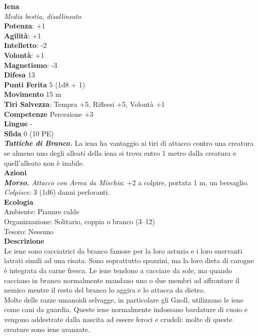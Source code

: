 \begin{multicols}{2}
\medskip\textbf{Iena}\\
\emph{Media bestia, disallineato}\\
\textbf{Potenza}: +1\\
\textbf{Agilità}: +1\\
\textbf{Intelletto}: -2\\
\textbf{Volontà}: +1\\
\textbf{Magnetismo}: -3\\
\textbf{Difesa} 13\\
\textbf{Punti Ferita} 5 (1d8 + 1)\\
\textbf{Movimento} 15 m\\
\textbf{Tiri Salvezza}: Tempra +5, Riflessi +5, Volontà +1 \\
\textbf{Competenze} Percezione +3\\
\textbf{Lingue} -\\
\textbf{Sfida} 0 (10 PE)\smallskip\\
\emph{\textbf{Tattiche di Branco.}} La iena ha vantaggio ai tiri di attacco contro una creatura se almeno uno degli alleati della iena si trova entro 1 metro dalla creatura e quell'alleato non è inabile.\\
\smallskip\textbf{Azioni}\\
\emph{\textbf{Morso.} Attacco con Arma da Mischia}: +2 a colpire, portata 1 m, un bersaglio.\\
\emph{Colpisce:} 3 (1d6) danni perforanti.\\
\textbf{Ecologia}\\
Ambiente: Pianure calde\\
Organizzazione: Solitario, coppia o branco (3–12)\\
Tesoro: Nessuno\\
\textbf{Descrizione}\\

Le iene sono cacciatrici da branco famose per la loro astuzia e i loro snervanti latrati simili ad una risata. Sono soprattutto spazzini, ma la loro dieta di carogne è integrata da carne fresca. Le iene tendono a cacciare da sole, ma quando cacciano in branco normalmente mandano uno o due membri ad affrontare il nemico mentre il resto del branco lo aggira e lo attacca da dietro.\\

Molte delle razze umanoidi selvagge, in particolare gli Gnoll, utilizzano le iene come cani da guardia. Queste iene normalmente indossano bardature di cuoio e vengono addestrate dalla nascita ad essere feroci e crudeli: molte di queste creature sono iene avanzate. \\



\end{multicols}
